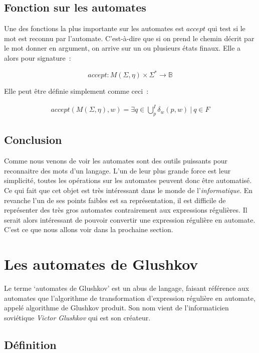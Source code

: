 \documentclass[12pt]{article}
\begin{document}
\subsection{Fonction sur les automates}

Une des fonctions la plus importante sur les automates est \(accept\) qui test
si le mot est reconnu par l'automate. C'est-à-dire que si on prend le chemin
décrit par le mot donner en argument, on arrive sur un ou plusieurs états
finaux. Elle a alors pour signature~:

\[
    accept: M(\Sigma, \eta) \times \Sigma^* \to \mathbb{B}
\]

Elle peut être définie simplement comme ceci~:

\begin{align}
    accept(M(\Sigma, \eta), w) = \exists q \in \bigcup_{p}^I \delta_w(p, w) ~|~ q \in F
\end{align}

\subsection{Conclusion}

Comme nous venons de voir les automates sont des outils puissants pour
reconnaitre des mots d'un langage. L'un de leur plus grande force est leur
simplicité, toutes les opérations sur les automates peuvent donc être
automatisé. Ce qui fait que cet objet est très intéressant dans le monde de
l'\textit{informatique}. En revanche l'un de ses points faibles est sa
représentation, il est difficile de représenter des très gros automates
contrairement aux expressions régulières. Il serait alors intéressant de
pouvoir convertir une expression régulière en automate. C'est ce que nous
allons voir dans la prochaine section.

\section{Les automates de Glushkov}\label{sec:glushkov}

Le terme `automates de Glushkov' est un abus de langage, faisant référence aux
automates que l'algorithme de transformation d'expression régulière en
automate, appelé algorithme de Glushkov produit. Son nom vient de
l'informaticien soviétique \textit{Victor Glushkov} qui est son créateur.

\subsection{Définition}
\end{document}
